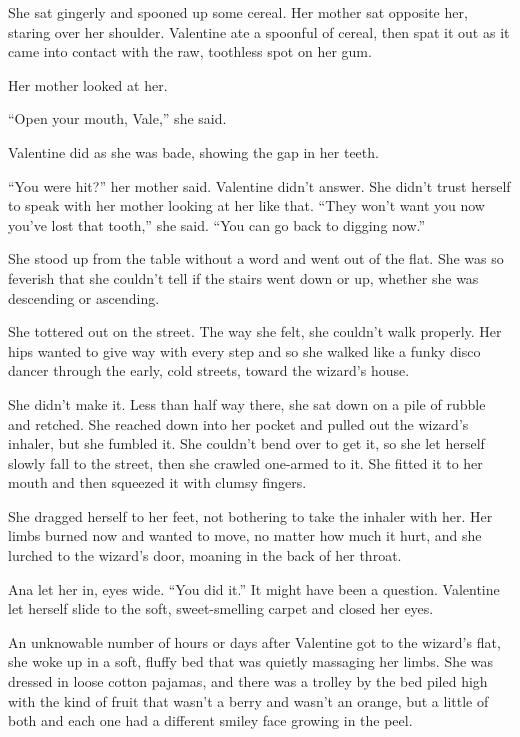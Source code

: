 She sat gingerly and spooned up some cereal. Her mother sat
opposite her, staring over her shoulder. Valentine ate a spoonful
of cereal, then spat it out as it came into contact with the raw,
toothless spot on her gum.

Her mother looked at her.

“Open your mouth, Vale,” she said.

Valentine did as she was bade, showing the gap in her teeth.

“You were hit?” her mother said. Valentine didn’t answer. She
didn’t trust herself to speak with her mother looking at her like
that. “They won’t want you now you’ve lost that tooth,” she said.
“You can go back to digging now.”

She stood up from the table without a word and went out of the
flat. She was so feverish that she couldn’t tell if the stairs went
down or up, whether she was descending or ascending.

She tottered out on the street. The way she felt, she couldn’t walk
properly. Her hips wanted to give way with every step and so she
walked like a funky disco dancer through the early, cold streets,
toward the wizard’s house.

She didn’t make it. Less than half way there, she sat down on a
pile of rubble and retched. She reached down into her pocket and
pulled out the wizard’s inhaler, but she fumbled it. She couldn’t
bend over to get it, so she let herself slowly fall to the street,
then she crawled one-armed to it. She fitted it to her mouth and
then squeezed it with clumsy fingers.

She dragged herself to her feet, not bothering to take the inhaler
with her. Her limbs burned now and wanted to move, no matter how
much it hurt, and she lurched to the wizard’s door, moaning in the
back of her throat.

Ana let her in, eyes wide. “You did it.” It might have been a
question. Valentine let herself slide to the soft, sweet-smelling
carpet and closed her eyes.

\tb

An unknowable number of hours or days after Valentine got to the
wizard’s flat, she woke up in a soft, fluffy bed that was quietly
massaging her limbs. She was dressed in loose cotton pajamas, and
there was a trolley by the bed piled high with the kind of fruit
that wasn’t a berry and wasn’t an orange, but a little of both and
each one had a different smiley face growing in the peel.

